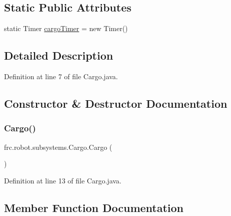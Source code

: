 \subsection*{Static Public Attributes}
\begin{DoxyCompactItemize}
\item 
static Timer \hyperlink{classfrc_1_1robot_1_1subsystems_1_1Cargo_a50722902fa0c3ad0db5f592ad51b94f6}{cargo\+Timer} = new Timer()
\end{DoxyCompactItemize}


\subsection{Detailed Description}


Definition at line 7 of file Cargo.\+java.



\subsection{Constructor \& Destructor Documentation}
\mbox{\label{classfrc_1_1robot_1_1subsystems_1_1Cargo_ad27213bb1c8c9a33d5c2b9cc153c1508}} 
\subsubsection{\texorpdfstring{Cargo()}{Cargo()}}
{\footnotesize\ttfamily frc.\+robot.\+subsystems.\+Cargo.\+Cargo (\begin{DoxyParamCaption}{ }\end{DoxyParamCaption})}



Definition at line 13 of file Cargo.\+java.



\subsection{Member Function Documentation}
\mbox{\label{classfrc_1_1robot_1_1subsystems_1_1Cargo_aa8640bc75e8b3f2472ea586936d6ed1f}} 
